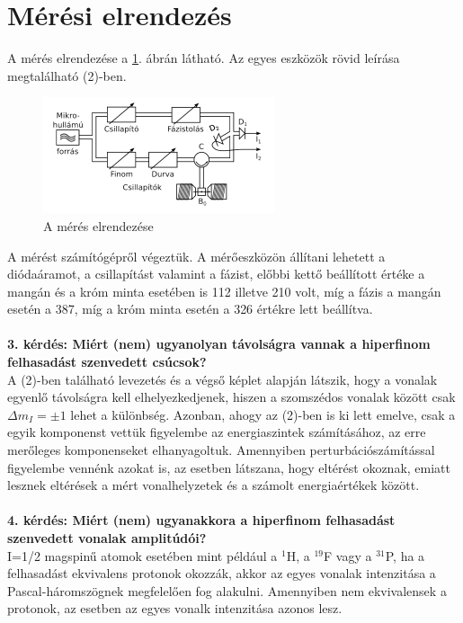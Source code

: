 \documentclass[12pt,a4paper]{article}
\begin{document}
\section{Mérési elrendezés}
\hspace*{10pt} A mérés elrendezése a \ref{im-1}. ábrán látható. Az egyes eszközök rövid leírása megtalálható (2)-ben.\\
\begin{figure}[!h]
\centering
\includegraphics[scale=3]{elrend}
\caption{A mérés elrendezése}
\label{im-1}
\end{figure}
\newline
A mérést számítógépről végeztük. A mérőeszközön állítani lehetett a diódaáramot, a csillapítást valamint a fázist, előbbi kettő beállított értéke a mangán és a króm minta esetében is 112 illetve 210 volt, míg a fázis a mangán esetén a 387, míg a króm minta esetén a 326 értékre lett beállítva.\\
\\
\textbf{3. kérdés: Miért (nem) ugyanolyan távolságra vannak a hiperfinom felhasadást szenvedett csúcsok?}\\
A (2)-ben található levezetés és a végső képlet alapján látszik, hogy a  vonalak egyenlő távolságra kell elhelyezkedjenek, hiszen a szomszédos vonalak között csak $\Delta m_I=\pm 1$ lehet a különbség. Azonban, ahogy az (2)-ben is ki lett emelve, csak a egyik komponenst vettük figyelembe az energiaszintek számításához, az erre merőleges komponenseket elhanyagoltuk. Amennyiben perturbációszámítással figyelembe vennénk azokat is, az esetben látszana, hogy eltérést okoznak, emiatt lesznek eltérések a mért vonalhelyzetek és a számolt energiaértékek között.\\
\\
\textbf{4. kérdés: Miért (nem) ugyanakkora a hiperfinom felhasadást szenvedett vonalak amplitúdói?}\\
I=1/2 magspinű atomok esetében mint például a $^1$H, a $^{19}$F vagy a $^{31}$P, ha a felhasadást ekvivalens protonok okozzák, akkor az egyes vonalak intenzitása a Pascal-háromszögnek megfelelően fog alakulni. Amennyiben nem ekvivalensek a protonok, az esetben az egyes vonalk intenzitása azonos lesz.\\
\end{document}
